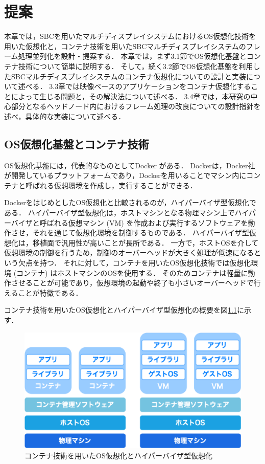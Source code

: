 \chapter{提案}
本章では，SBCを用いたマルチディスプレイシステムにおけるOS仮想化技術を用いた仮想化と，コンテナ技術を用いたSBCマルチディスプレイシステムのフレーム処理並列化を設計・提案する．
本章では，まず3.1節でOS仮想化基盤とコンテナ技術について簡単に説明する．
そして，続く3.2節でOS仮想化基盤を利用したSBCマルチディスプレイシステムのコンテナ仮想化についての設計と実装について述べる．
3.3章では映像ベースのアプリケーションをコンテナ仮想化することによって生じる問題と，その解決法について述べる．
3.4章では，本研究の中心部分となるヘッドノード内におけるフレーム処理の改良についての設計指針を述べ，具体的な実装について述べる．

\section{OS仮想化基盤とコンテナ技術}
OS仮想化基盤には，代表的なものとしてDocker \cite{docker,using_docker}がある．
Dockerは，Docker社が開発しているプラットフォームであり，Dockerを用いることでマシン内にコンテナと呼ばれる仮想環境を作成し，実行することができる．

DockerをはじめとしたOS仮想化と比較されるのが，ハイパーバイザ型仮想化である．
ハイパーバイザ型仮想化は，ホストマシンとなる物理マシン上でハイパーバイザと呼ばれる仮想マシン (VM) を作成および実行するソフトウェアを動作させ，それを通じて仮想化環境を制御するものである．
ハイパーバイザ型仮想化は，移植面で汎用性が高いことが長所である．
一方で，ホストOSを介して仮想環境の制御を行うため，制御のオーバーヘッドが大きく処理が低速になるという欠点を持つ．
それに対して，コンテナを用いたOS仮想化技術では仮想化環境 (コンテナ) はホストマシンのOSを使用する．
そのためコンテナは軽量に動作させることが可能であり，仮想環境の起動や終了も小さいオーバーヘッドで行えることが特徴である．

コンテナ技術を用いたOS仮想化とハイパーバイザ型仮想化の概要を図\ref{docker}に示す．

\begin{figure}[H]
    \hspace*{\fill}
    \includegraphics[width=\linewidth]{./fig/chap3/docker.eps}
    \hspace*{\fill}
    \caption{コンテナ技術を用いたOS仮想化とハイパーバイザ型仮想化}
    \label{docker}
\end{figure}

